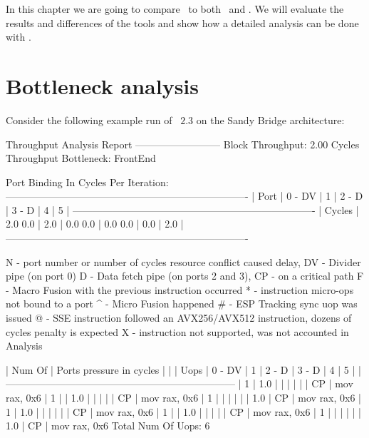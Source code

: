 In this chapter we are going to compare \suaca\ to both \iaca\ and \osaca. We will evaluate the results and differences of the tools and show how a detailed analysis can be done with \suaca.

\section{Bottleneck analysis}

Consider the following example run of \iaca\ $2.3$ on the Sandy Bridge architecture:

\begin{example}
        Throughput Analysis Report
        --------------------------
        Block Throughput: 2.00 Cycles       Throughput Bottleneck: FrontEnd
        
        Port Binding In Cycles Per Iteration:
        -------------------------------------------------------------------------
        |  Port  |  0   -  DV  |  1   |  2   -  D   |  3   -  D   |  4   |  5   |
        -------------------------------------------------------------------------
        | Cycles | 2.0    0.0  | 2.0  | 0.0    0.0  | 0.0    0.0  | 0.0  | 2.0  |
        -------------------------------------------------------------------------
        
        N - port number or number of cycles resource conflict caused delay, DV - Divider pipe (on port 0)
        D - Data fetch pipe (on ports 2 and 3), CP - on a critical path
        F - Macro Fusion with the previous instruction occurred
        * - instruction micro-ops not bound to a port
        ^ - Micro Fusion happened
        # - ESP Tracking sync uop was issued
        @ - SSE instruction followed an AVX256/AVX512 instruction, dozens of cycles penalty is expected
        X - instruction not supported, was not accounted in Analysis
        
        | Num Of |              Ports pressure in cycles               |    |
        |  Uops  |  0  - DV  |  1  |  2  -  D  |  3  -  D  |  4  |  5  |    |
        ---------------------------------------------------------------------
        |   1    | 1.0       |     |           |           |     |     | CP | mov rax, 0x6
        |   1    |           | 1.0 |           |           |     |     | CP | mov rax, 0x6
        |   1    |           |     |           |           |     | 1.0 | CP | mov rax, 0x6
        |   1    | 1.0       |     |           |           |     |     | CP | mov rax, 0x6
        |   1    |           | 1.0 |           |           |     |     | CP | mov rax, 0x6
        |   1    |           |     |           |           |     | 1.0 | CP | mov rax, 0x6
        Total Num Of Uops: 6
\end{example}


